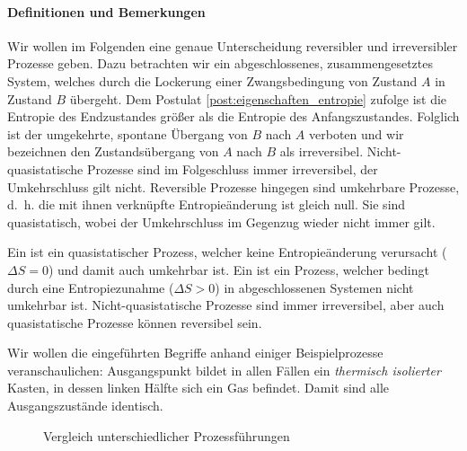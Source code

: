 \paragraph*{Definitionen und Bemerkungen }
Wir wollen im Folgenden eine genaue Unterscheidung reversibler und irreversibler Prozesse geben. 
Dazu betrachten wir ein abgeschlossenes, zusammengesetztes System, welches durch die Lockerung einer Zwangsbedingung von Zustand $A$
in Zustand $B$ übergeht. Dem Postulat \ref{post:eigenschaften_entropie} zufolge ist die Entropie des Endzustandes größer als die Entropie des Anfangszustandes.
Folglich ist der umgekehrte, spontane Übergang von $B$ nach $A$ verboten und wir bezeichnen den Zustandsübergang von $A$ nach $B$ als irreversibel. Nicht-quasistatische Prozesse sind im Folgeschluss immer irreversibel, der Umkehrschluss gilt nicht.
Reversible Prozesse hingegen sind umkehrbare Prozesse, d.~h. die mit ihnen verknüpfte Entropieänderung ist gleich null.
Sie sind quasistatisch, wobei der Umkehrschluss im Gegenzug wieder nicht immer gilt. %
\begin{formal}
    Ein  ist ein quasistatischer Prozess, welcher keine Entropieänderung verursacht ($\Delta S=0$) und damit auch umkehrbar ist. 
    Ein  ist ein Prozess, welcher bedingt durch eine Entropiezunahme ($\Delta S>0$) in abgeschlossenen Systemen nicht umkehrbar ist. Nicht-quasistatische Prozesse sind immer irreversibel, aber auch quasistatische Prozesse können reversibel sein.
\end{formal}
Wir wollen die eingeführten Begriffe anhand einiger Beispielprozesse veranschaulichen:
Ausgangspunkt bildet in allen Fällen ein \emph{thermisch isolierter} Kasten, in dessen linken Hälfte sich ein Gas befindet. Damit sind alle Ausgangszustände identisch.
\begin{figure}[htbp]
    \centering
    \begin{subfigure}[b]{.32\textwidth}
        \centering
        \tfigProcessReversibleQuasistationary        
        \caption{}
        \label{fig:ProcessReversibleQuasistationary}
    \end{subfigure}
    \begin{subfigure}[b]{.32\textwidth}
        \centering
        \tfigProcessIrreversibleQuasistationary           
        \caption{}
        \label{fig:ProcessIrreversibleQuasistationary}
    \end{subfigure}
    \begin{subfigure}[b]{.32\textwidth}
        \centering     
        \tfigProcessIrreversibleNonquasistationary
        \caption{}
        \label{fig:ProcessIrreversibleNonquasistationary}
    \end{subfigure}
    \caption{Vergleich unterschiedlicher Prozessführungen}
    \label{fig:ProcessReversibleIrreversibleQuasistationary}
\end{figure}
